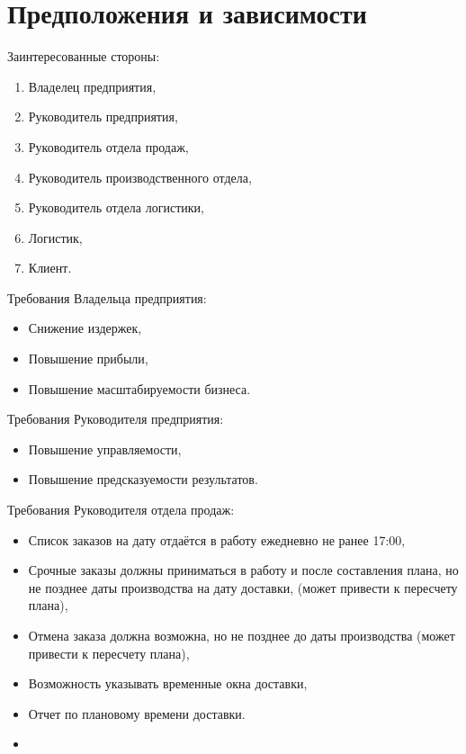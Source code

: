 \section{Предположения и зависимости}
\label{sec:dep}

Заинтересованные стороны:
\begin{enumerate}
    \item Владелец предприятия,
    \item Руководитель предприятия,
    \item Руководитель отдела продаж,
    \item Руководитель производственного отдела,
    \item Руководитель отдела логистики,
    \item Логистик,
    \item Клиент.
\end{enumerate}

Требования Владельца предприятия:
\begin{itemize}
    \item Снижение издержек,
    \item Повышение прибыли,
    \item Повышение масштабируемости бизнеса.
\end{itemize}

Требования Руководителя предприятия:
\begin{itemize}
    \item Повышение управляемости,
    \item Повышение предсказуемости результатов.
\end{itemize}

Требования Руководителя отдела продаж:
\begin{itemize}
    \item Список заказов на дату отдаётся в работу ежедневно не ранее 17:00,
    \item Срочные заказы должны приниматься в работу и после составления плана, но не позднее даты производства на дату доставки, (может привести к пересчету плана),
    \item Отмена заказа должна возможна, но не позднее до даты производства (может привести к пересчету плана),
    \item Возможность указывать временные окна доставки,
    \item Отчет по плановому времени доставки.
\item \end{itemize}

